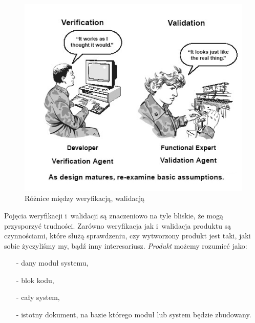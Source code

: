 \documentclass[brudnopis]{xmgr}
\begin{document}
\begin{figure}[th!]
\centering
\includegraphics[width=.7\hsize]{images/Verification_Validation_Accreditation}
\caption{Różnice między weryfikacją, walidacją\label{RYS.1}}
\end{figure}

\textcolor{sb}{Pojęcia weryfikacji i~walidacji są znaczeniowo na tyle bliskie, że mogą przysporzyć trudności.} \textcolor{sa}{Zarówno weryfikacja jak i~walidacja produktu są czynnościami, które służą sprawdzeniu,} \textcolor{sb}{czy wytworzony produkt jest taki, jaki sobie życzyliśmy my, bądź inny interesariusz.} \textcolor{sa}{\textit{Produkt} możemy rozumieć jako: }

\begin{itemize}
  \item[-] \textcolor{sa}{dany moduł systemu,}
  \item[-] \textcolor{sa}{blok kodu,}
  \item[-] \textcolor{sa}{cały system,}
  \item[-] \textcolor{sa}{istotny dokument, na bazie którego moduł lub system będzie zbudowany.}
\end{itemize}
\end{document}
